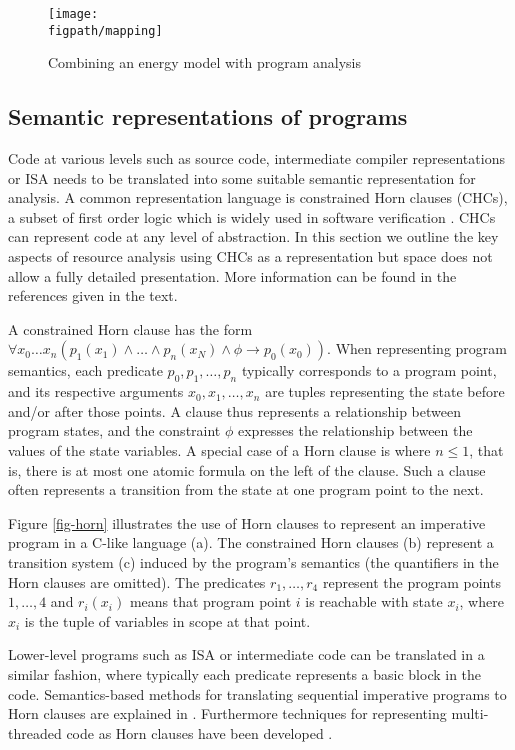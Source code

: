 \begin{figure}
\texttt{[image: \\figpath/mapping]}   
 \caption{Combining an energy model with program analysis}
 \label{fig-model-mapping}
 \end{figure}

\subsection{Semantic representations of programs}
Code at various levels such as source code, intermediate compiler
representations or ISA needs to be translated into some suitable semantic
representation for analysis.   A common representation language is
constrained Horn clauses (CHCs), a subset of first order logic which is
widely used in software verification
\cite{DBLP:conf/birthday/BjornerGMR15}. CHCs can represent code at any
level of abstraction. In this section we outline the key aspects of
resource analysis using CHCs as a representation but space does not
allow a fully detailed presentation.  More information can be found in the
references given in the text.

A constrained Horn clause has the form $\forall x_0 \ldots x_n 
(p_1(x_1) \wedge \ldots \wedge p_n(x_N) \wedge \phi \rightarrow
p_0(x_0))$. When representing program semantics, each predicate
$p_0,p_1,\ldots,p_n$ typically corresponds to a program point, and its
respective arguments $x_0,x_1,\ldots,x_n$ are tuples representing the
state before and/or after those points.  A clause thus represents a
relationship between program states, and the constraint $\phi$ expresses
the relationship between the values of the state variables. A special case
of a Horn clause is where $n \le 1$, that is, there is at most one atomic
formula on the left of the clause.  Such a clause often represents a transition 
from the state at one program point to the next.

Figure \ref{fig-horn} illustrates the use of Horn clauses to 
represent an imperative program in a C-like language (a).
The constrained Horn clauses (b) represent a transition
system (c) induced by the program's semantics (the quantifiers in
the Horn clauses are
omitted).  The predicates
$r_1, \ldots, r_4$ represent the program points $1,\ldots,4$ and
$r_i(x_i)$ means that program point $i$  is reachable with state
$x_i$, where $x_i$ is the tuple of variables in scope at that point.

Lower-level programs such as ISA or intermediate code can be translated
in a similar fashion, where typically each predicate represents a basic block 
in the code. Semantics-based methods for translating sequential
imperative programs to
Horn clauses are explained in \cite{DBLP:conf/ppdp/AngelisFPP15}.
Furthermore techniques for representing multi-threaded
code as Horn clauses have been developed \cite{ GrebenshchikovLPR12}.


